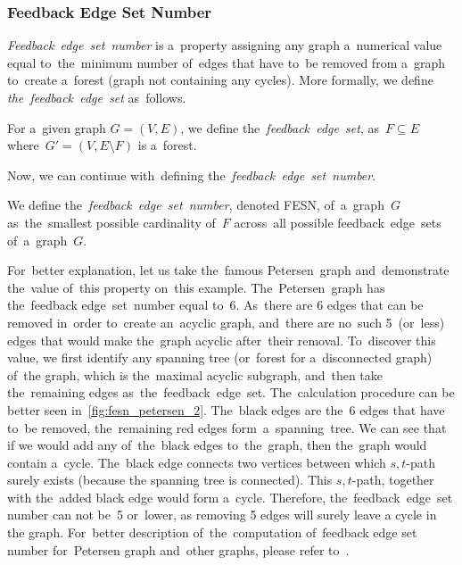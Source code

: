 \subsubsection{Feedback Edge Set Number}
\label{subsubsec:fesn}
\textit{Feedback~edge~set~number} is a~property assigning any graph a~numerical value equal to~the~minimum number of~edges that have to~be removed from a~graph to~create a~forest (graph not containing any cycles).
More formally, we define \textit{the~feedback~edge~set} as~follows.
\begin{definition}
    For a~given graph $G = (V, E)$, we define the~\emph{feedback~edge~set}, as~$F \subseteq E$ where~$G' = (V, E \setminus F)$ is a~forest.
\end{definition}
Now, we can continue with~defining the~\textit{feedback~edge~set~number}.
\begin{definition}
    We define the~\emph{feedback~edge~set~number}, denoted FESN, of~a~graph~$G$ as~the~smallest possible cardinality of~$F$ across~all possible feedback~edge~sets of~a~graph~$G$.
\end{definition}
For~better explanation, let us take the~famous Petersen~graph and~demonstrate the~value of~this property on~this example. The~Petersen~graph has the~feedback edge~set~number equal to~6. As~there are 6 edges that can be removed in~order to~create an~acyclic graph, and~there are no~such 5~(or~less) edges that would make the~graph acyclic after~their removal. To~discover this value, we first identify any spanning tree (or~forest for a~disconnected graph) of~the graph, which is the~maximal acyclic subgraph, and~then take the~remaining edges as~the~feedback~edge~set. The~calculation procedure can be better seen in~\autoref{fig:fesn_petersen_2}.
The~black edges are the~6 edges that have to~be removed, the~remaining red edges form~a~spanning~tree. We can see that if we would add any of~the~black edges to~the~graph, then the~graph would contain a~cycle. The~black edge connects two vertices between which $s,t$-path surely exists (because the spanning tree is connected). This $s,t$-path, together with the~added black edge would form a~cycle. Therefore, the~feedback~edge~set number can not be~5 or~lower, as removing 5 edges will surely leave a cycle in the graph. For~better description of~the~computation of~feedback edge set number for~Petersen graph and~other graphs, please refer to~\cite{Beineke}.
\pagebreak
